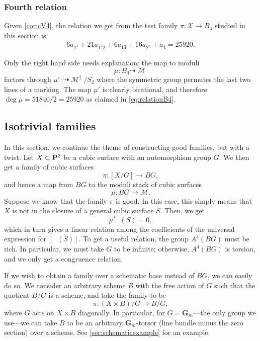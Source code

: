 \documentclass[12pt,reqno]{amsart}
\DeclareMathOperator{\Orb}{\overline{Orb}}
\DeclareMathOperator{\M}{\mathcal{M}}
\renewcommand{\to}{{\longrightarrow}}
\numberwithin{equation}{section}
\newcommand{\G}{\mathbf G}
\begin{document}
\subsubsection{Fourth relation}
\label{sec:relation-b_4}

Given \autoref{cor:cV4}, the relation we get from the test family
$\pi: \mathcal{X} \to B_{4}$ studied in this section is:
\begin{align}
  \label{eq:relationB4}
  6a_{1^{4}} + 21a_{1^{2}2}+6a_{13}+16a_{2^{2}}+a_{4} =  25920.
\end{align}

Only the right hand side needs explanation: the map to moduli
\[\mu: B_{4} \dashrightarrow \M \] factors through
$\mu' : \dashrightarrow \M^{\dagger}/S_{2}$ where the symmetric group
permutes the last two lines of a marking.  The map $\mu'$ is clearly
birational, and therefore $\deg \mu = 51840/2 = 25920$ as claimed in
\eqref{eq:relationB4}.



\subsection{Isotrivial families}
In this section, we continue the theme of constructing good families, but with a twist.
Let $X \subset \P^3$ be a cubic surface with an automorphism group $G$.
We then get a family of cubic surfaces
\[ \pi \colon [X/G] \to BG,\]
and hence a map from $BG$ to the moduli stack of cubic surfaces
\[ \mu \colon BG \to \mathscr M.\]
Suppose we know that the family $\pi$ is good.
In this case, this simply means that $X$ is not in the closure of a general cubic surface $S$.
Then, we get
\[ \mu^* \Orb(S) = 0,\]
which in turn gives a linear relation among the coefficients of the universal expression for $[\Orb(S)]$.
To get a useful relation, the group $A^4(BG)$ must be rich.
In particular, we must take $G$ to be infinite; otherwise, $A^4(BG)$ is torsion, and we only get a congruence relation.

If we wish to obtain a family over a schematic base instead of $BG$, we can easily do so.
We consider an arbitrary scheme $B$ with the free action of $G$ such that the quotient $B/G$ is a scheme, and take the family to be
\[ \pi \colon (X \times B)/G \to B/G,\]
where $G$ acts on $X \times B$ diagonally.
In particular, for $G = \G_m$---the only group we use---we can take $B$ to be an arbitrary $\G_m$-torsor (line bundle minus the zero section) over a scheme.
See \autoref{sec:schematicexample} for an example.
\end{document}
